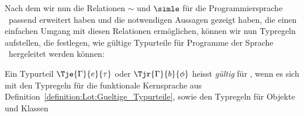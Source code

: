 Nach dem wir nun die Relationen $\sim$ und $\simle$ f\"ur die Programmiersprache \Lct\ passend erweitert haben
und die notwendigen Aussagen gezeigt haben, die einen einfachen Umgang mit diesen Relationen erm\"oglichen,
k\"onnen wir nun Typregeln aufstellen, die festlegen, wie g\"ultige Typurteile f\"ur Programme der Sprache
\Lct\ hergeleitet werden k\"onnen:

\begin{definition} \label{definition:Lct:Gueltige_Typurteile}
  Ein Typurteil $\Tje{\Gamma}{e}{\tau}$ oder $\Tjr{\Gamma}{b}{\phi}$ heisst {\em g\"ultig} f\"ur
  \Lct, wenn es sich mit den Typregeln f\"ur die funktionale Kernsprache aus
  Definition~\ref{definition:Lot:Gueltige_Typurteile}, sowie den Typregeln f\"ur Objekte und
  Klassen\\[5mm]
\end{definition}
